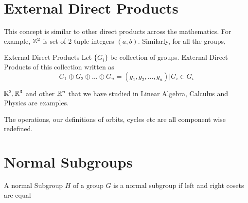 \section{External Direct Products}
This concept is similar to other direct products across the mathematics. For example, $\mathbb Z^2$ is set of 2-tuple integers $(a,b)$.
Similarly, for all the groups,
\begin{definition}{External Direct Products}
    Let $\{ G_i\}$ be collection of groups. \alert{External Direct Products} of this collection written as
    \[ G_1 \oplus G_2 \oplus
    \ldots \oplus G_n = (g_1,g_2, \ldots, g_n) | G_i \in G_i\]
\end{definition}
\begin{example}
    $\mathbb R^2,\mathbb R^3$ and other $\mathbb R^n$ that we have studied in Linear Algebra, Calculus and Physics are examples.
\end{example}
The operations, our definitions of orbits, cycles etc are all component wise redefined.
\section{Normal Subgroups}
A normal Subgroup $H$ of a group $G$ is a normal subgroup if left and right cosets are equal
